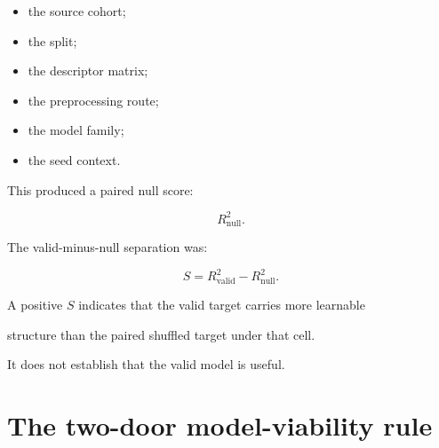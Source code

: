 \documentclass[11pt,a4paper,oneside]{report}
\providecommand{\Rnull}{\ensuremath{R^2_{\mathrm{null}}}}
\providecommand{\Rvalid}{\ensuremath{R^2_{\mathrm{valid}}}}
\begin{document}
\begin{itemize}



\item

the source cohort;



\item

the split;



\item

the descriptor matrix;



\item

the preprocessing route;



\item

the model family;



\item

the seed context.



\end{itemize}



This produced a paired null score:



\begin{equation}
\Rnull.
\end{equation}



The valid-minus-null separation was:



\begin{equation}
\label{eq:null-separation}
S
=
\Rvalid
-
\Rnull.
\end{equation}



A positive $S$ indicates that the valid target carries more learnable

structure than the paired shuffled target under that cell.



It does not establish that the valid model is useful.





\section{The two-door model-viability rule}
\end{document}

